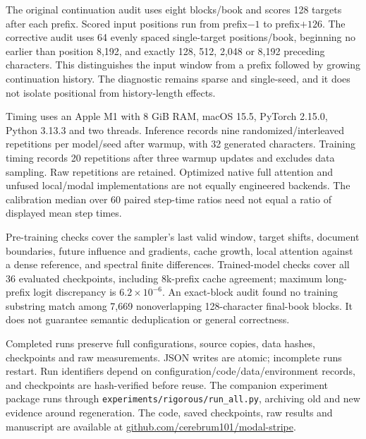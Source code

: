 \documentclass[11pt,letterpaper]{article}
\begin{document}
The original continuation audit uses eight blocks/book and scores 128 targets after each prefix. Scored input positions run from prefix$-1$ to prefix$+126$. The corrective audit uses 64 evenly spaced single-target positions/book, beginning no earlier than position 8,192, and exactly 128, 512, 2,048 or 8,192 preceding characters. This distinguishes the input window from a prefix followed by growing continuation history. The diagnostic remains sparse and single-seed, and it does not isolate positional from history-length effects.

Timing uses an Apple M1 with 8 GiB RAM, macOS 15.5, PyTorch 2.15.0, Python 3.13.3 and two threads. Inference records nine randomized/interleaved repetitions per model/seed after warmup, with 32 generated characters. Training timing records 20 repetitions after three warmup updates and excludes data sampling. Raw repetitions are retained. Optimized native full attention and unfused local/modal implementations are not equally engineered backends. The calibration median over 60 paired step-time ratios need not equal a ratio of displayed mean step times.

Pre-training checks cover the sampler's last valid window, target shifts, document boundaries, future influence and gradients, cache growth, local attention against a dense reference, and spectral finite differences. Trained-model checks cover all 36 evaluated checkpoints, including 8k-prefix cache agreement; maximum long-prefix logit discrepancy is $6.2\times10^{-6}$. An exact-block audit found no training substring match among 7,669 nonoverlapping 128-character final-book blocks. It does not guarantee semantic deduplication or general correctness.

Completed runs preserve full configurations, source copies, data hashes, checkpoints and raw measurements. JSON writes are atomic; incomplete runs restart. Run identifiers depend on configuration/code/data/environment records, and checkpoints are hash-verified before reuse. The companion experiment package runs through \texttt{experiments/rigorous/run\_all.py}, archiving old and new evidence around regeneration. The code, saved checkpoints, raw results and manuscript are available at \href{https://github.com/cerebrum101/modal-stripe}{github.com/cerebrum101/modal-stripe}.
\end{document}
